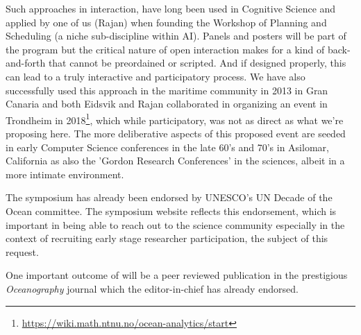 \begin{itemize}



\end{itemize}  

\noindent
Such approaches in interaction, have long been used in Cognitive
Science and applied by one of us (Rajan) when founding the \nas
Workshop of Planning and Scheduling (a niche sub-discipline within
AI). Panels and posters will be part of the program but the critical
nature of open interaction makes for a kind of back-and-forth that
cannot be preordained or scripted. And if designed properly, this can
lead to a truly interactive and participatory process. We have also
successfully used this approach in the maritime community in 2013 in
Gran Canaria and both Eidsvik and Rajan collaborated in organizing an
event in Trondheim in
2018\footnote{\url{https://wiki.math.ntnu.no/ocean-analytics/start}},
which while participatory, was not as direct as what we're proposing
here. The more deliberative aspects of this proposed event are seeded
in early Computer Science conferences in the late 60's and 70's in
Asilomar, California as also the 'Gordon Research Conferences' in the
sciences, albeit in a more intimate environment.

The symposium has already been endorsed by UNESCO's UN Decade of the
Ocean committee. The symposium website reflects this endorsement,
which is important in being able to reach out to the science community
especially in the context of recruiting early stage researcher
participation, the subject of this request.

One important outcome of \symp will be a peer reviewed publication in
the prestigious \emph{Oceanography} journal which the editor-in-chief
has already endorsed.
